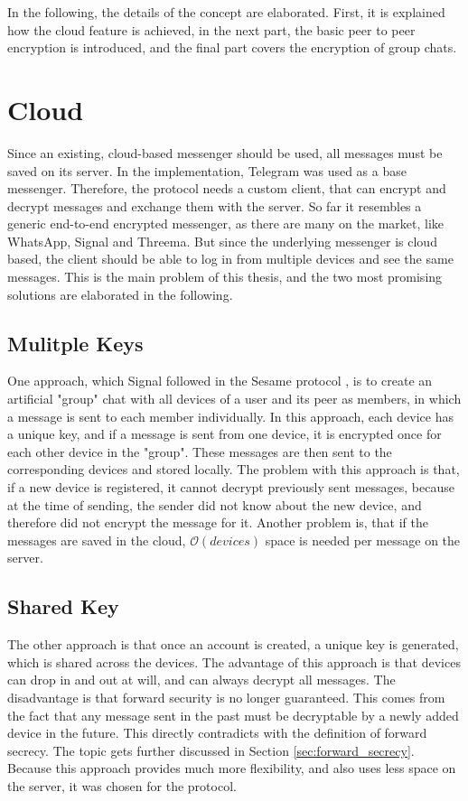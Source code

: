 \documentclass[a4paper, oneside]{discothesis}
\begin{document}
In the following, the details of the concept are elaborated. First, it is explained how the cloud feature is achieved, in the next part, the basic peer to peer encryption is introduced, and the final part covers the encryption of group chats.

\section{Cloud}

Since an existing, cloud-based messenger should be used, all messages must be saved on its server. In the implementation, Telegram was used as a base messenger. Therefore, the protocol needs a custom client, that can encrypt and decrypt messages and exchange them with the server. So far it resembles a generic end-to-end encrypted messenger, as there are many on the market, like WhatsApp, Signal and Threema. But since the underlying messenger is cloud based, the client should be able to log in from multiple devices and see the same messages. This is the main problem of this thesis, and the two most promising solutions are elaborated in the following.

\subsection{Mulitple Keys}

One approach, which Signal followed in the Sesame protocol \cite{Sesame}, is to create an artificial "group" chat with all devices of a user and its peer as members, in which a message is sent to each member individually. In this approach, each device has a unique key, and if a message is sent from one device, it is encrypted once for each other device in the "group". These messages are then sent to the corresponding devices and stored locally. The problem with this approach is that, if a new device is registered, it cannot decrypt previously sent messages, because at the time of sending, the sender did not know about the new device, and therefore did not encrypt the message for it. Another problem is, that if the messages are saved in the cloud, $\mathcal{O}(devices)$ space is needed per message on the server.

\subsection{Shared Key}

The other approach is that once an account is created, a unique key is generated, which is shared across the devices. The advantage of this approach is that devices can drop in and out at will, and can always decrypt all messages. The disadvantage is that forward security is no longer guaranteed. This comes from the fact that any message sent in the past must be decryptable by a newly added device in the future. This directly contradicts with the definition of forward secrecy. The topic gets further discussed in Section \ref{sec:forward_secrecy}. Because this approach provides much more flexibility, and also uses less space on the server, it was chosen for the protocol.
\end{document}
